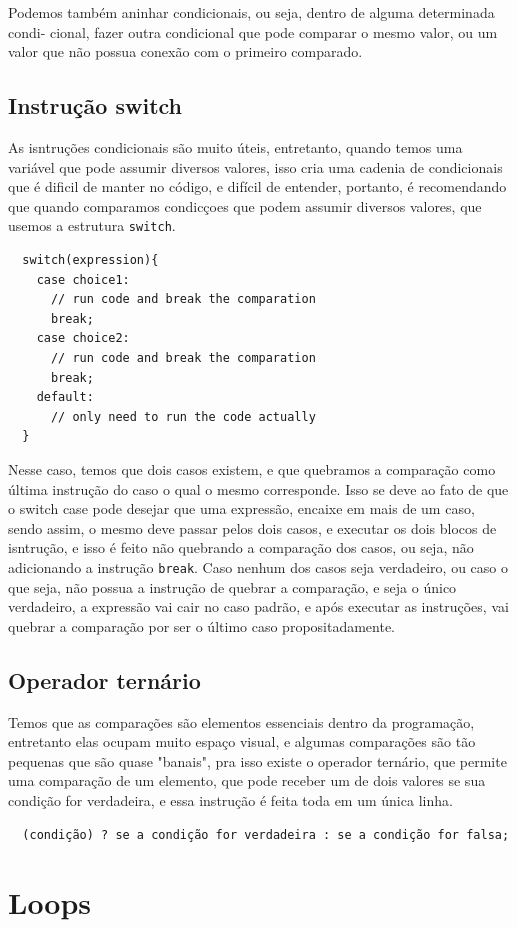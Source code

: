 \documentclass[12pt, a4paper]{paper}
\begin{document}
Podemos também aninhar condicionais, ou seja, dentro de alguma determinada condi-
cional, fazer outra condicional que pode comparar o mesmo valor, ou um valor que não possua
conexão com o primeiro comparado.

\subsection{Instrução switch} %
\label{sub:Instrução switch}
As isntruções condicionais são muito úteis, entretanto, quando temos uma variável
que pode assumir diversos valores, isso cria uma cadenia de condicionais que é dificil
de manter no código, e difícil de entender, portanto, é recomendando que quando 
comparamos condicçoes que podem assumir diversos valores, que usemos 
a estrutura \texttt{switch}.

\begin{verbatim}
  switch(expression){
    case choice1:
      // run code and break the comparation
      break;
    case choice2:
      // run code and break the comparation
      break;
    default:
      // only need to run the code actually
  } 
\end{verbatim}

Nesse caso, temos que dois casos existem, e que quebramos a comparação como última 
instrução do caso o qual o mesmo corresponde. Isso se deve ao fato de que o switch case 
pode desejar que uma expressão, encaixe em mais de um caso, sendo assim, o mesmo deve 
passar pelos dois casos, e executar os dois blocos de isntrução, e isso é feito não 
quebrando a comparação dos casos, ou seja, não adicionando a instrução \texttt{break}.
Caso nenhum dos casos seja verdadeiro, ou caso o que seja, não possua a instrução de 
quebrar a comparação, e seja o único verdadeiro, a expressão vai cair no caso padrão, 
e após executar as instruções, vai quebrar a comparação por ser o último caso 
propositadamente.

\subsection{Operador ternário} %
\label{sub:Operador ternário}
Temos que as comparações são elementos essenciais dentro da programação, entretanto 
elas ocupam muito espaço visual, e algumas comparações são tão pequenas que são quase
"banais", pra isso existe o operador ternário, que permite uma comparação de um 
elemento, que pode receber um de dois valores se sua condição for verdadeira, e essa 
instrução é feita toda em um única linha.

\begin{verbatim}
  (condição) ? se a condição for verdadeira : se a condição for falsa;
\end{verbatim}

\section{Loops} %
\label{sec:Loops}


\end{document}
